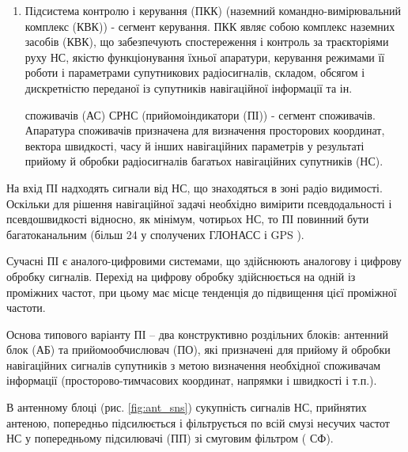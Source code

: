 \begin{enumerate}

 


 космічних апаратів (ПКА), що складається з навігаційних супутників (НС) 
(мережа навігаційних супутників - космічний сегмент). ПКА СРНС складається з визначеного 
числа навігаційних супутників. Основні функції НС --- формування і випромінювання 
радіосигналів, необхідних для навігаційних визначень споживачів СРНС, контролю бортових 
систем супутника підсистемою контролю і керування СРНС. Відповідні характеристики сигналів 
НС і способи їхньої обробки дозволяють проводити навігаційні виміри з високою точністю.

 \item Підсистема контролю і керування (ПКК) (наземний командно-вимірювальний комплекс (КВК)) - 
сегмент керування. ПКК являє собою комплекс наземних засобів (КВК), що забезпечують 
спостереження і контроль за траєкторіями руху НС, якістю функціонування їхньої апаратури, 
керування режимами її роботи і параметрами супутникових радіосигналів, складом, обсягом і 
дискретністю переданої із супутників навігаційної інформації та ін.

  споживачів (АС) СРНС (прийомоіндикатори (ПІ)) - сегмент споживачів.
Апаратура споживачів призначена для визначення просторових координат, вектора швидкості, 
часу й інших навігаційних параметрів у результаті прийому й обробки радіосигналів багатьох 
навігаційних супутників (НС).

\end{enumerate}
На вхід ПІ надходять сигнали від НС, що знаходяться в зоні радіо видимості. Оскільки для 
рішення навігаційної задачі необхідно вимірити псевдодальності і псевдошвидкості відносно, 
як мінімум, чотирьох НС, то ПІ повинний бути багатоканальним (більш 24 у сполучених ГЛОНАСС і GPS ).

Сучасні ПІ є аналого-цифровими системами, що здійснюють аналогову і цифрову обробку 
сигналів. Перехід на цифрову обробку здійснюється на одній із проміжних частот, при 
цьому має місце тенденція до підвищення цієї проміжної частоти.

Основа типового варіанту ПІ -- два конструктивно роздільних блоків: антенний блок (АБ) та 
прийомообчислювач (ПО), які призначені для прийому й обробки навігаційних сигналів 
супутників з метою визначення необхідної споживачам інформації (просторово-тимчасових 
координат, напрямки і швидкості і т.п.).

В антенному блоці (рис. \ref{fig:ant_sns}) сукупність сигналів НС, прийнятих антеною, попередньо 
підсилюється і фільтрується по всій смузі несучих частот НС у попередньому підсилювачі 
(ПП) зі смуговим фільтром ( СФ). 

